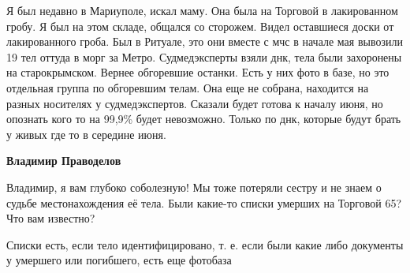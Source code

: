 
Я был недавно в Мариуполе, искал маму. Она была на Торговой в лакированном
гробу. Я был на этом складе, общался со сторожем. Видел оставшиеся доски от
лакированного гроба. Был в Ритуале, это они вместе с мчс в начале мая вывозили 19
тел оттуда в морг за Метро. Судмедэксперты взяли днк, тела были захоронены на
старокрымском. Вернее обгоревшие останки. Есть у них фото в базе, но это отдельная
группа по обгоревшим телам. Она еще не собрана, находится на разных носителях у
судмедэкспертов. Сказали будет готова к началу июня, но опознать кого то на 99,9\%
будет невозможно. Только по днк, которые будут брать у живых где то в середине
июня.

\begin{itemize} %
\textbf{Владимир Праводелов} 

Владимир, я вам глубоко соболезную! Мы тоже потеряли сестру и не знаем о судьбе
местонахождения её тела. Были какие-то списки умерших на Торговой 65? Что вам
известно?


Списки есть, если тело идентифицировано, т. е. если были какие либо документы у
умершего или погибшего, есть еще фотобаза
\end{itemize} %
